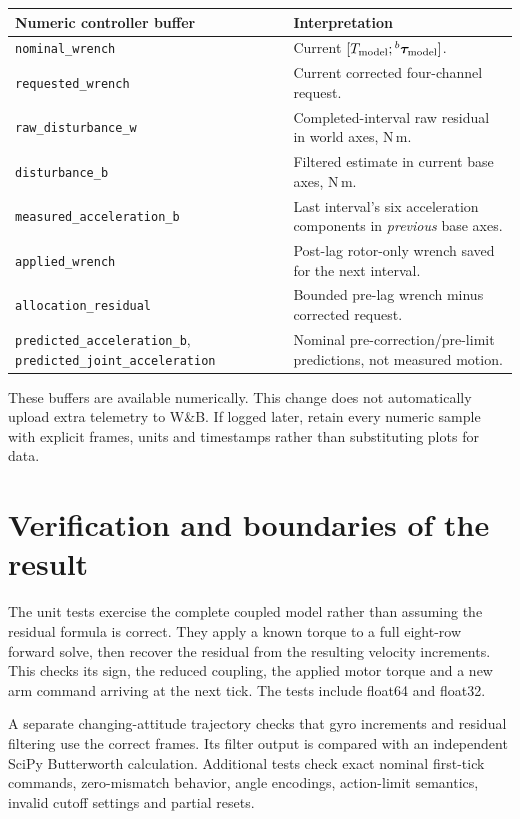 \documentclass[11pt,a4paper]{article}
\newcommand{\vct}[1]{\boldsymbol{#1}}
\newcommand{\bv}[1]{{}^{b}\vct{#1}}
\begin{document}
\begin{longtable}{L{5.2cm}L{9.5cm}}
\toprule Numeric controller buffer & Interpretation\\\midrule\endhead
\texttt{nominal\_wrench} & Current $[T_{\rm model};\bv\tau_{\rm model}]$.\\
\texttt{requested\_wrench} & Current corrected four-channel request.\\
\texttt{raw\_disturbance\_w} & Completed-interval raw residual in world axes, N\,m.\\
\texttt{disturbance\_b} & Filtered estimate in current base axes, N\,m.\\
\texttt{measured\_acceleration\_b} & Last interval's six acceleration components in \emph{previous} base axes.\\
\texttt{applied\_wrench} & Post-lag rotor-only wrench saved for the next interval.\\
\texttt{allocation\_residual} & Bounded pre-lag wrench minus corrected request.\\
\texttt{predicted\_acceleration\_b}, \texttt{predicted\_joint\_}\newline\texttt{acceleration} & Nominal pre-correction/pre-limit predictions, not measured motion.\\\bottomrule
\end{longtable}
These buffers are available numerically. This change does not automatically
upload extra telemetry to W\&B. If logged later, retain every numeric sample with
explicit frames, units and timestamps rather than substituting plots for data.

\section{Verification and boundaries of the result}\label{sec:verification}

The unit tests exercise the complete coupled model rather than assuming the
residual formula is correct. They apply a known torque to a full eight-row
forward solve, then recover the residual from the resulting velocity increments.
This checks its sign, the reduced coupling, the applied motor torque and a new
arm command arriving at the next tick. The tests include float64 and float32.

A separate changing-attitude trajectory checks that gyro increments and residual
filtering use the correct frames. Its filter output is compared with an
independent SciPy Butterworth calculation. Additional tests check exact nominal
first-tick commands, zero-mismatch behavior, angle encodings, action-limit
semantics, invalid cutoff settings and partial resets.
\end{document}
